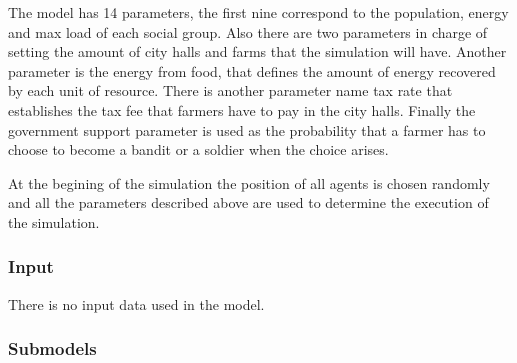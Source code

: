 \documentclass{wscpaperproc}
\begin{document}
The model has 14 parameters, the first nine correspond to the population,
energy and max load of each social group. Also there are two parameters in
charge of setting the amount of city halls and farms that the simulation will
have. Another parameter is the energy from food, that defines the amount of
energy recovered by each unit of resource. There is another parameter name tax
rate that establishes the tax fee that farmers have to pay in the city halls.
Finally the government support parameter is used as the probability that a
farmer has to choose to become a bandit or a soldier when the choice arises.

At the begining of the simulation the position of all agents is chosen randomly
and all the parameters described above are used to determine the execution of
the simulation.

\subsubsection{Input}

There is no input data used in the model.

\subsubsection{Submodels}
\end{document}
